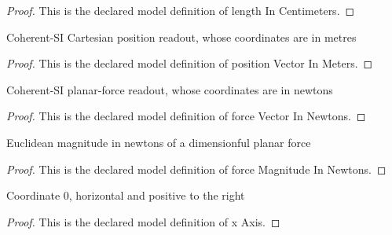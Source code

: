 \begin{proof}
  This is the declared model definition of length In Centimeters.
\end{proof}
\begin{definition}
  \label{def:physics:phyx-mini-0890:phyxminiproblems-problemphyxmini0890-positionvectorinmeters}
  Coherent-SI Cartesian position readout, whose coordinates are in metres
\end{definition}
\begin{proof}
  This is the declared model definition of position Vector In Meters.
\end{proof}
\begin{definition}
  \label{def:physics:phyx-mini-0890:phyxminiproblems-problemphyxmini0890-forcevectorinnewtons}
  Coherent-SI planar-force readout, whose coordinates are in newtons
\end{definition}
\begin{proof}
  This is the declared model definition of force Vector In Newtons.
\end{proof}
\begin{definition}
  \label{def:physics:phyx-mini-0890:phyxminiproblems-problemphyxmini0890-forcemagnitudeinnewtons}
  Euclidean magnitude in newtons of a dimensionful planar force
\end{definition}
\begin{proof}
  This is the declared model definition of force Magnitude In Newtons.
\end{proof}
\begin{definition}[x Axis]
  \label{def:physics:phyx-mini-0890:phyxminiproblems-problemphyxmini0890-xaxis}
  Coordinate 0, horizontal and positive to the right
\end{definition}
\begin{proof}
  This is the declared model definition of x Axis.
\end{proof}
